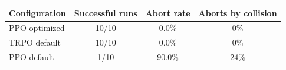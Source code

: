 \begin{tabular}{lccc}
\toprule
Configuration & Successful runs & Abort rate & Aborts by collision \\
\midrule
PPO optimized & 10/10 & 0.0\% & 0\% \\
TRPO default & 10/10 & 0.0\% & 0\% \\
PPO default & 1/10 & 90.0\% & 24\% \\
\bottomrule
\end{tabular}
